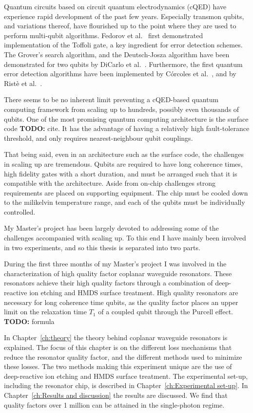 \documentclass[12pt]{report}
\begin{document}
  Quantum circuits based on circuit quantum electrodynamics (cQED) have experience rapid development of the past few years. Especially transmon qubits, and variations thereof, have flourished up to the point where they are used to perform multi-qubit algorithms. Fedorov et al.~\cite{fedorov2011implementation} first demonstrated implementation of the Toffoli gate, a key ingredient for error detection schemes. The Grover's search algorithm, and the Deutsch-Josza algorithm have been demonstrated for two qubits by DiCarlo et al.~\cite{dicarlo2009demonstration}. Furthermore, the first quantum error detection algorithms have been implemented by C\'orcoles et al.~\cite{corcoles2015demonstration}, and by Rist\`e et al.~\cite{riste2014detecting}.

  There seems to be no inherent limit preventing a cQED-based quantum computing framework from scaling up to hundreds, possibly even thousands of qubits. One of the most promising quantum computing architecture is the surface code \textbf{TODO:} cite. It has the advantage of having a relatively high fault-tolerance threshold, and only requires nearest-neighbour qubit couplings.

  That being said, even in an architecture such as the surface code, the challenges in scaling up are tremendous. Qubits are required to have long coherence times, high fidelity gates with a short duration, and must be arranged such that it is compatible with the architecture. Aside from on-chip challenges strong requirements are placed on supporting equipment. The chip must be cooled down to the milikelvin temperature range, and each of the qubits must be individually controlled.

  My Master's project has been largely devoted to addressing some of the challenges accompanied with scaling up. To this end I have mainly been involved in two experiments, and so this thesis is separated into two parts.

  During the first three months of my Master's project I was involved in the characterization of high quality factor coplanar waveguide resonators. These resonators achieve their high quality factors through a combination of deep-reactive ion etching and HMDS surface treatment. High quality resonators are necessary for long coherence time qubits, as the quality factor places an upper limit on the relaxation time $T_1$ of a coupled qubit through the Purcell effect. \textbf{TODO:} formula

  In Chapter~\ref{ch:theory} the theory behind coplanar waveguide resonators is explained. The focus of this chapter is on the different loss mechanisms that reduce the resonator quality factor, and the different methods used to minimize these losses. The two methods making this experiment unique are the use of deep-reactive ion etching and HMDS surface treatment. The experimental set-up, including the resonator chip, is described in Chapter~\ref{ch:Experimental set-up}. In Chapter~\ref{ch:Results and discussion} the results are discussed. We find that quality factors over 1 million can be attained in the single-photon regime.
\end{document}
